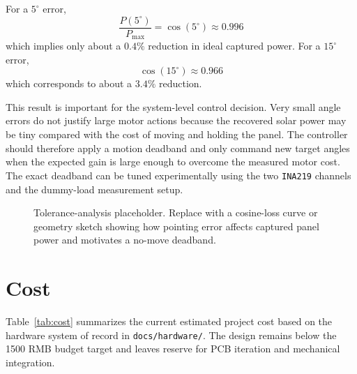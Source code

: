 \documentclass[11pt]{article}
\begin{document}
For a $5^\circ$ error,
\begin{equation}
\frac{P(5^\circ)}{P_{\max}} = \cos(5^\circ) \approx 0.996
\end{equation}
which implies only about a $0.4\%$ reduction in ideal captured power. For a $15^\circ$ error,
\begin{equation}
\cos(15^\circ) \approx 0.966
\end{equation}
which corresponds to about a $3.4\%$ reduction.

This result is important for the system-level control decision. Very small angle errors do not justify large motor actions because the recovered solar power may be tiny compared with the cost of moving and holding the panel. The controller should therefore apply a motion deadband and only command new target angles when the expected gain is large enough to overcome the measured motor cost. The exact deadband can be tuned experimentally using the two \texttt{INA219} channels and the dummy-load measurement setup.

\begin{figure}[H]
\centering
\fbox{\rule{0pt}{2.0in}\rule{0.82\linewidth}{0pt}}
\caption{Tolerance-analysis placeholder. Replace with a cosine-loss curve or geometry sketch showing how pointing error affects captured panel power and motivates a no-move deadband.}
\label{fig:tolerance}
\end{figure}

\section{Cost}

Table~\ref{tab:cost} summarizes the current estimated project cost based on the hardware system of record in \texttt{docs/hardware/}. The design remains below the 1500 RMB budget target and leaves reserve for PCB iteration and mechanical integration.
\end{document}
